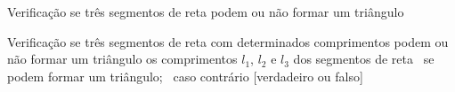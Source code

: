 \documentclass[
  11pt,
  a4paper,
]{scrbook}
\begin{document}
\begin{algorithm}
\caption{\label{alg-triangulo-valido-logico}Verificação se três
segmentos de reta podem ou não formar um triângulo}
\begingroup%


\begin{algorithmic}
    \Description Verificação se três segmentos de reta com determinados comprimentos podem ou não formar um triângulo
    \Require os comprimentos $l_1$, $l_2$ e $l_3$ dos segmentos de reta
    \Ensure \True\ se podem formar um triângulo; \False\ caso contrário
    \Statex{}
    [verdadeiro ou falso]
\end{algorithmic}

\endgroup
\end{algorithm}
\end{document}
